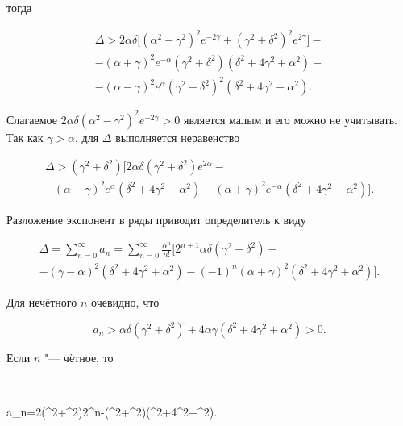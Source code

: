 тогда

 \begin{multline*} 

\Delta>2\alpha\delta\big[ (\alpha^2-\gamma^2)^2e^{-2\gamma}+(\gamma^2+\delta^2)^2e^{2\gamma} \big]- \\ - (\alpha+\gamma)^2 e^{-\alpha}(\gamma^2+\delta^2) (\delta^2+4\gamma^2+\alpha^2)- 

\\

-(\alpha-\gamma)^2 e^{\alpha}(\gamma^2+\delta^2)^2 (\delta^2+4\gamma^2+\alpha^2).

\end{multline*}

Слагаемое $2\alpha\delta (\alpha^2-\gamma^2)^2e^{-2\gamma}>0$ является малым и его можно не учитывать. Так как $\gamma>\alpha$, для $\Delta$ выполняется неравенство 

 \begin{multline*} 

\Delta>(\gamma^2+\delta^2) \bigl[2\alpha\delta(\gamma^2+\delta^2)e^{2\alpha}-

\\ -

(\alpha-\gamma)^2 e^{\alpha} (\delta^2+4\gamma^2+\alpha^2)-(\alpha+\gamma)^2 e^{-\alpha}(\delta^2+4\gamma^2+\alpha^2)\bigr].

\end{multline*}

Разложение экспонент в ряды приводит определитель к виду

\begin{multline*}

\Delta=\sum\limits_{n=0}^{\infty}a_{n}=

\sum\limits_{n=0}^{\infty}\frac{\alpha^n}{n!}\big[2^{n+1}\alpha\delta(\gamma^2+\delta^2)-\\- (\gamma-\alpha)^2  (\delta^2+4\gamma^2+\alpha^2)-(-1)^{n}(\alpha+\gamma)^2 (\delta^2+4\gamma^2+\alpha^2)\big].

\end{multline*}

Для нечётного $n$ очевидно, что 

$$a_{n}>\alpha\delta(\gamma^2+\delta^2)+ 4\alpha\gamma(\delta^2+4\gamma^2+\alpha^2)>0.$$ 

Если $n$ "--- чётное, то 

$$

a_n=2\alpha\delta(\gamma^2+\delta^2)2^{n}-(\gamma^2+\alpha^2)(\delta^2+4\gamma^2+\alpha^2).

